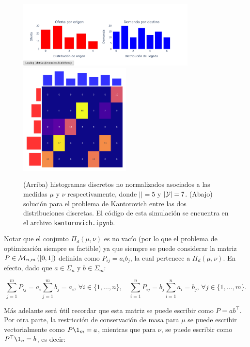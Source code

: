 \begin{figure}
	\centering
	\includegraphics[width=0.8\textwidth]{images/ot/kantorovich_discrete_histogram}
	\includegraphics[width=0.5\textwidth]{images/ot/kantorovich_discrete_solution}
	\caption{(Arriba) histogramas discretos no normalizados asociados a las medidas $\mu$ y $\nu$ respectivamente, donde $|\xspace|=5$ y $|\mathcal{Y}|=7$. (Abajo) solución para el problema de Kantorovich entre las dos distribuciones discretas. El código de esta simulación se encuentra en el archivo \texttt{kantorovich.ipynb}.}
	\label{fig:ot/kantorovich_discrete_example}
\end{figure}

Notar que el conjunto $\Pi_d(\mu,\nu)$ es no vacío (por lo que el problema de optimización siempre es factible) ya que siempre se puede considerar la matriz $P\in\mathcal{M}_{n,m}\left([0,1]\right)$ definida como $P_{ij}=a_ib_j$, la cual pertenece a $\Pi_d(\mu,\nu)$. En efecto, dado que $a\in\Sigma_n$ y $b\in\Sigma_m$:

\begin{equation*}
	\sum_{j=1}^m P_{ij} = a_i\sum_{j=1}^m b_j = a_i,\, \forall i\in\{1,\ldots,n\},
	\quad
	\sum_{i=1}^n P_{ij} = b_j\sum_{i=1}^n a_i = b_j,\, \forall j\in\{1,\ldots,m\}.
\end{equation*}

Más adelante será útil recordar que esta matriz se puede escribir como $P=ab^\top$. Por otra parte, la restricción de conservación de masa para $\mu$ se puede escribir vectorialmente como $P\1_{m}=a$, mientras que para $\nu$, se puede escribir como $P^\top \1_n = b$, es decir:

